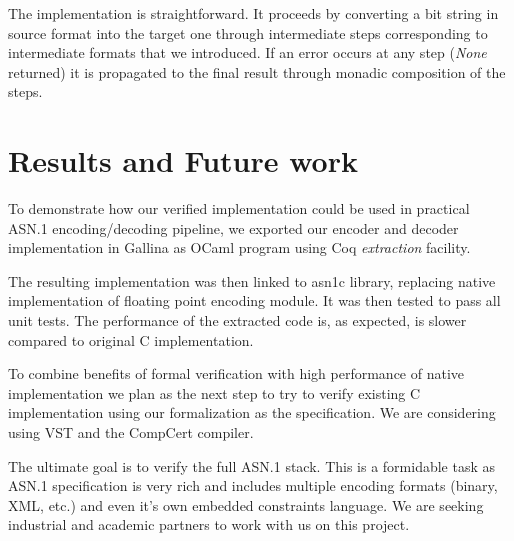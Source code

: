 \documentclass[sigplan]{acmart}
\begin{document}
The implementation is straightforward. It proceeds by converting a bit string in
source format into the target one through intermediate steps corresponding to
intermediate formats that we introduced. If an error occurs at any step
(\emph{None} returned) it is propagated to the final result through
monadic composition of the steps.

\section{Results and Future work}

To demonstrate how our verified implementation could be used in practical ASN.1 encoding/decoding pipeline, we exported our encoder and decoder implementation in Gallina as OCaml program using Coq \textit{extraction}\cite{letouzey2008extraction} facility. 

The resulting implementation was then linked to asn1c library, replacing native implementation of floating point encoding module. It was then tested to pass all unit tests. The performance of the extracted code is, as expected, is slower compared to original C implementation.

To combine benefits of formal verification with high performance of native
implementation we plan as the next step to try to verify existing C implementation
using our formalization as the specification. We are considering using
VST\cite{appel2011verified} and the CompCert compiler\cite{leroy2012compcert}. 

The ultimate goal is to verify the full ASN.1 stack. This is a formidable task as
ASN.1 specification is very rich and includes multiple encoding formats
(binary, XML, etc.) and even it's own embedded constraints language. We are
seeking industrial and academic partners to work with us on this project.

\nocite{*}

\end{document}
